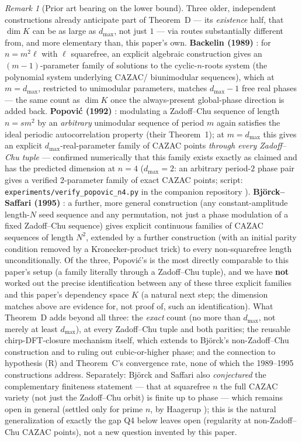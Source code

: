 \documentclass[11pt]{article}
\theoremstyle{plain}
\theoremstyle{definition}
\theoremstyle{remark}
\newtheorem{remark}[theorem]{Remark}
\begin{document}
\begin{remark}[Prior art bearing on the lower bound]
Three older, independent constructions already anticipate part of
Theorem~D --- its \emph{existence} half, that $\dim K$ can be as large as
$d_{\max}$, not just $1$ --- via routes substantially different from, and
more elementary than, this paper's own. \textbf{Backelin (1989)}
\cite{Backelin89}: for $n=m^2\ell$ with $\ell$ squarefree, an explicit
algebraic construction gives an $(m-1)$-parameter family of solutions to
the cyclic-$n$-roots system (the polynomial system underlying CAZAC/
biunimodular sequences), which at $m=d_{\max}$, restricted to unimodular
parameters, matches $d_{\max}-1$ free real phases --- the same count as
$\dim K$ once the always-present global-phase direction is added back.
\textbf{Popovi\'c (1992)} \cite{Popovic92}: modulating a Zadoff--Chu
sequence of length $n=sm^2$ by an \emph{arbitrary} unimodular sequence of
period $m$ again satisfies the ideal periodic autocorrelation property
(their Theorem~1); at $m=d_{\max}$ this gives an explicit
$d_{\max}$-real-parameter family of CAZAC points \emph{through every
Zadoff--Chu tuple} --- confirmed numerically that this family exists
exactly as claimed and has the predicted dimension at $n=4$ ($d_{\max}=2$:
an arbitrary period-$2$ phase pair gives a verified $2$-parameter family
of exact CAZAC points; script: {\tt experiments/verify\_popovic\_n4.py} in
the companion repository \cite{CazacAlgorithmRepo}). \textbf{Bj\"orck--Saffari (1995)} \cite{BjorckSaffari95}:
a further, more general construction (any constant-amplitude length-$N$
seed sequence and any permutation, not just a phase modulation of a fixed
Zadoff--Chu sequence) gives explicit continuous families of CAZAC
sequences of length $N^2$, extended by a further construction (with an
initial parity condition removed by a Kronecker-product trick) to every
non-squarefree length unconditionally. Of the three,
Popovi\'c's is the most directly comparable to this paper's setup (a
family literally through a Zadoff--Chu tuple), and we have \textbf{not}
worked out the precise identification between any of these three explicit
families and this paper's dependency space $K$ (a natural next step; the
dimension matches above are evidence for, not proof of, such an
identification). What Theorem~D adds beyond all three: the \emph{exact}
count (no more than $d_{\max}$, not merely at least $d_{\max}$), at every
Zadoff--Chu tuple and both parities; the reusable chirp-DFT-closure
mechanism itself, which extends to Bj\"orck's non-Zadoff--Chu construction
and to ruling out cubic-or-higher phase; and the connection to hypothesis
(R) and Theorem~C's convergence rate, none of which the 1989--1995
constructions address. Separately: Bj\"orck and Saffari also
\emph{conjectured} the complementary finiteness statement --- that at
squarefree $n$ the full CAZAC variety (not just the Zadoff--Chu orbit) is
finite up to phase --- which remains open in general (settled only for
prime $n$, by Haagerup \cite{Haagerup08}); this is the natural generalization of exactly
the gap Q4 below leaves open (regularity at non-Zadoff--Chu CAZAC points),
not a new question invented by this paper.
\end{remark}
\end{document}
